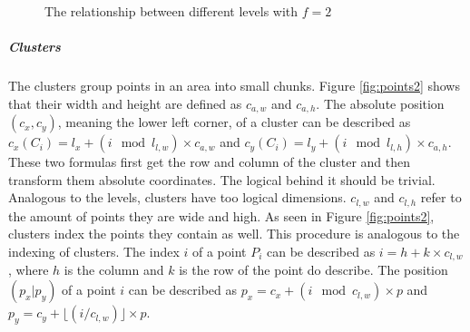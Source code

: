 \documentclass[10pt,a4paper,titlepage]{article}
\begin{document}
	\begin{figure}
		\centering
		\caption{The relationship between different levels with \(f = 2\)}
		\label{fig:levels_factor}
	\end{figure}
	\subparagraph{Clusters}\label{sec:clusters}
	The clusters group points in an area into small chunks. Figure \ref{fig:points2} shows that their width and height are defined as \(c_{a,w}\) and \(c_{a,h}\). The absolute position \((c_x,c_y)\), meaning the lower left corner, of a cluster can be described as \(c_x(C_i) = l_x + (i \mod l_{l,w}) \times c_{a,w}\) and \(c_y(C_i) = l_y + (i \mod l_{l,h}) \times c_{a,h}\). These two formulas first get the row and column of the cluster and then transform them absolute coordinates. The logical behind it should be trivial.\\	
	Analogous to the levels, clusters have too logical dimensions. \(c_{l,w}\) and \(c_{l,h}\) refer to the amount of points they are wide and high. As seen in Figure \ref{fig:points2}, clusters index the points they contain as well. This procedure is analogous to the indexing of clusters. The index \(i\) of a point \(P_i\) can be described as \(i = h + k \times c_{l,w}\), where \(h\) is the column and \(k\) is the row of the point do describe. The position \((p_x|p_y)\) of a point \(i\) can be described as \(p_x = c_x + (i \mod c_{l,w}) \times p\) and \(p_y = c_y + \lfloor (i / c_{l,w}) \rfloor \times p\).
\end{document}
